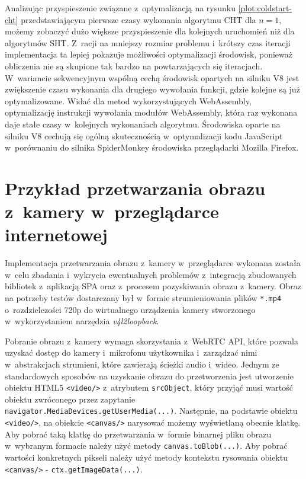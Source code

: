 Analizując przyspieszenie związane z~optymalizacją na rysunku \ref{plot:coldstart-cht} przedstawiającym pierwsze czasy wykonania algorytmu CHT dla $n=1$, możemy zobaczyć dużo większe przyspieszenie dla kolejnych uruchomień niż dla algorytmów SHT. Z~racji na mniejszy rozmiar problemu i~krótszy czas iteracji implementacja ta lepiej pokazuje możliwości optymalizacji środowisk, ponieważ obliczenia nie są skupione tak bardzo na powtarzających się iteracjach. W~wariancie sekwencyjnym wspólną cechą środowisk opartych na silniku V8 jest zwiększenie czasu wykonania dla drugiego wywołania funkcji, gdzie kolejne są już optymalizowane. Widać dla metod wykorzystujących WebAssembly, optymalizację instrukcji wywołania modułów WebAssembly, która raz wykonana daje stałe czasy w~kolejnych wykonaniach algorytmu. Środowiska oparte na silniku V8 cechują się ogólną skutecznością w~optymalizacji kodu JavaScript w~porównaniu do silnika SpiderMonkey środowiska przeglądarki Mozilla Firefox.

\section{Przykład przetwarzania obrazu z~kamery w~przeglądarce internetowej}

Implementacja przetwarzania obrazu z~kamery w~przeglądarce wykonana została w~celu zbadania i~wykrycia ewentualnych problemów z~integracją zbudowanych bibliotek z~aplikacją SPA oraz z~procesem pozyskiwania obrazu z~kamery. Obraz na potrzeby testów dostarczany był w~formie strumieniowania plików \lstinline{*.mp4} o~rozdzielczości 720p do wirtualnego urządzenia kamery stworzonego w~wykorzystaniem narzędzia \textit{v4l2loopback}.

Pobranie obrazu z~kamery wymaga skorzystania z~WebRTC API, które pozwala uzyskać dostęp do kamery i~mikrofonu użytkownika i~zarządzać nimi w~abstrakcjach strumieni, które zawierają ścieżki audio i~wideo. Jednym ze standardowych sposobów na uzyskanie obrazu do przetworzenia jest utworzenie obiektu HTML5 \lstinline{<video/>} z~atrybutem \lstinline{srcObject}, który przyjąć musi wartość obiektu zwróconego przez zapytanie \lstinline{navigator.MediaDevices.getUserMedia(...)}. Następnie, na podstawie obiektu \lstinline{<video/>}, na obiekcie \lstinline{<canvas/>} narysować możemy wyświetlaną obecnie klatkę. Aby pobrać taką klatkę do przetwarzania w~formie binarnej pliku obrazu w~wybranym formacie należy użyć metody \lstinline{canvas.toBlob(...)}. Aby pobrać wartości konkretnych pikseli należy użyć metody kontekstu rysowania obiektu \lstinline{<canvas/>} - \lstinline{ctx.getImageData(...)}. 

